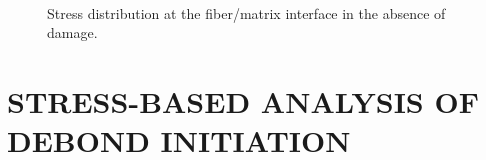 \documentclass[12pt,a4paper]{article}
\begin{document}
\begin{figure}[!hp]
    \ 
\caption{Stress distribution at the fiber/matrix interface in the absence of damage.}\label{fig:stress}
\end{figure}

\section{STRESS-BASED ANALYSIS OF DEBOND INITIATION}
\end{document}
